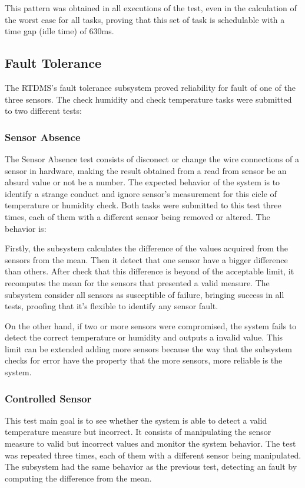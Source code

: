 \documentclass[12pt]{article}
\begin{document}
This pattern was obtained in all executions of the test, even in the calculation of the worst case for all tasks, proving
that this set of task is schedulable with a time gap (idle time) of 630ms.

\subsection{Fault Tolerance}
The RTDMS's fault tolerance subsystem proved reliability for fault of one of the three sensors. The check humidity and check
temperature tasks were submitted to two different tests:

\subsubsection{Sensor Absence}
The Sensor Absence test consists of disconect or change the wire connections of a sensor in hardware, making the result
obtained from a read from sensor be an absurd value or not be a number. The expected behavior of the system is to identify
a strange conduct and ignore sensor's measurement for this cicle of temperature or humidity check. Both tasks were 
submitted to this test three times, each of them with a different sensor being removed or altered. The behavior is:

Firstly, the subsystem calculates the difference of the values acquired from the sensors from the mean. Then it detect
that one sensor have a bigger difference than others. After check that this difference is beyond of the acceptable limit,
it recomputes the mean for the sensors that presented a valid measure. The subsystem consider all sensors as susceptible 
of failure, bringing success in all tests, proofing that it's flexible to identify any sensor fault.

On the other hand, if two or more sensors were compromised, the system fails to detect the correct temperature or humidity 
and outputs a invalid value. This limit can be extended adding more sensors because the way that the subsystem checks for 
error have the property that the more sensors, more reliable is the system.

\subsubsection{Controlled Sensor}
This test main goal is to see whether the system is able to detect a valid temperature measure but incorrect. It consists of
manipulating the sensor measure to valid but incorrect values and monitor the system behavior. The test was repeated three 
times, each of them with a different sensor being manipulated. The subsystem had the same behavior as the previous test, 
detecting an fault by computing the difference from the mean.
\end{document}
